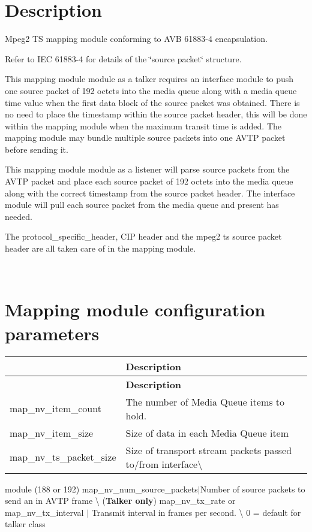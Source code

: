 \section*{Description}

Mpeg2 TS mapping module conforming to A\+VB 61883-\/4 encapsulation.

Refer to I\+EC 61883-\/4 for details of the \char`\"{}source packet\char`\"{} structure.

This mapping module module as a talker requires an interface module to push one source packet of 192 octets into the media queue along with a media queue time value when the first data block of the source packet was obtained. There is no need to place the timestamp within the source packet header, this will be done within the mapping module when the maximum transit time is added. The mapping module may bundle multiple source packets into one A\+V\+TP packet before sending it.

This mapping module module as a listener will parse source packets from the A\+V\+TP packet and place each source packet of 192 octets into the media queue along with the correct timestamp from the source packet header. The interface module will pull each source packet from the media queue and present has needed.

The protocol\+\_\+specific\+\_\+header, C\+IP header and the mpeg2 ts source packet header are all taken care of in the mapping module.

~\newline
 \section*{Mapping module configuration parameters}

\tabulinesep=1mm
\begin{longtabu} spread 0pt [c]{*2{|X[-1]}|}
\hline
{}&{\bf Description  }\\
\endfirsthead
\hline
\endfoot
\hline
{}&{\bf Description  }\\
\endhead
map\+\_\+nv\+\_\+item\+\_\+count &The number of Media Queue items to hold. \\
map\+\_\+nv\+\_\+item\+\_\+size &Size of data in each Media Queue item \\
map\+\_\+nv\+\_\+ts\+\_\+packet\+\_\+size&Size of transport stream packets passed to/from interface\textbackslash{} \\
\end{longtabu}
module (188 or 192) map\+\_\+nv\+\_\+num\+\_\+source\+\_\+packets$\vert$\+Number of source packets to send an in A\+V\+TP frame \textbackslash{} ({\bfseries Talker only}) map\+\_\+nv\+\_\+tx\+\_\+rate or map\+\_\+nv\+\_\+tx\+\_\+interval $\vert$ Transmit interval in frames per second. \textbackslash{} 0 = default for talker class 
